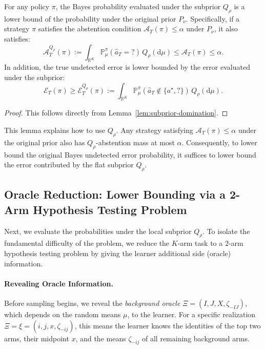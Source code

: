 \documentclass[10pt]{article}
\newcommand{\dd}{\mathrm{d}}
\theoremstyle{plain}
\begin{document}
\begin{lemma}\label{lem:risk-domination}

For any policy $\pi$, the Bayes probability evaluated under the subprior $Q_\rho$   is a lower bound of  the probability under the original prior $P_\nu$. Specifically, if a strategy $\pi$ satisfies the abstention condition $\mathcal{A}_T(\pi) \le \alpha$ under $P_\nu$, it also satisfies:
$$\mathcal{A}_T^{Q_\rho}(\pi) := \int_{\mathbb{R}^K} \mathbb{P}_\mu^\pi(\hat{a}_T=? )\,Q_\rho(\dd\mu) \le \mathcal{A}_T(\pi) \le \alpha.$$
In addition, the true undetected error is lower bounded by the error evaluated under the subprior:
$$\mathcal{E}_T(\pi) \ge \mathcal{E}_T^{Q_\rho}(\pi) := \int_{\mathbb{R}^K} \mathbb{P}_\mu^\pi(\hat{a}_T\notin\{a^\star,?\})\,Q_\rho(\dd\mu).$$
\end{lemma}

\begin{proof}
This follows directly from Lemma~\ref{lem:subprior-domination}.  
\end{proof}
This lemma explains how to  use  $Q_\rho$. Any strategy satisfying $\mathcal A_T(\pi)\le\alpha$ under the original prior also has $Q_\rho$-abstention mass at most $\alpha$. Consequently, to lower bound the original Bayes undetected error probability, it suffices to lower bound the error contributed by the flat subprior $Q_\rho$.






\subsection{Oracle Reduction: Lower Bounding via a 2-Arm Hypothesis Testing Problem} 
\label{subsec:local-oracle-reduction}

Next, we evaluate the probabilities under the local subprior $Q_\rho$. To isolate the fundamental difficulty of the problem, we reduce the $K$-arm task to a $2$-arm hypothesis testing problem by giving the learner additional side (oracle) information. 

\paragraph{Revealing Oracle Information.}
Before sampling begins, we reveal the \emph{background oracle} $\Xi = (I, J, X, \zeta_{-IJ})$, which depends on the random means $\mu$, to the learner. For a specific realization $\Xi = \xi = (i, j, x, \zeta_{-ij})$, this means the learner knows the identities of the top two arms, their midpoint $x$, and the   means $\zeta_{-ij}$ of all remaining background arms.
\end{document}
